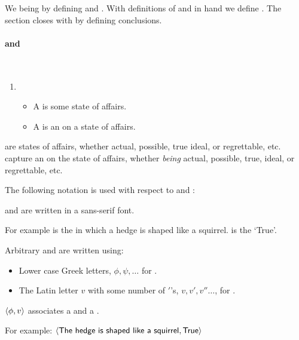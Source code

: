 \begin{note}
  We being by defining  and .
  With definitions of  and  in hand we define .
  The section closes with by defining conclusions.
\end{note}

\paragraph*{ and }

\begin{note}
  \begin{definition}
    \label{def:prop-val}
    \mbox{ }%
    \vspace{-\baselineskip}
    \begin{enumerate}[noitemsep, label=]
    \item
      \begin{itemize}
      \item
        A \emph{} is some state of affairs.
      \item
        A \emph{} is an \agpe{} on a state of affairs.
      \end{itemize}
    \end{enumerate}
    \vspace{-\baselineskip}
  \end{definition}

  \noindent%
   are states of affairs, whether actual, possible, true ideal, or regrettable, etc.
   capture an \agpe{} on the state of affairs, whether \emph{being} actual, possible, true, ideal, or regrettable, etc.
  
  The following notation is used with respect to  and :
  \begin{notationList}
  \item
     and  are written in a \textsf{sans-serif} font.
    
    For example  is the  in which a hedge is shaped like a squirrel.
     is the  `True'.
  \item
    Arbitrary  and  are written using:
    \begin{itemize}[noitemsep]
    \item
      Lower case Greek letters, \(\phi, \psi, \dots\) for .
    \item
      The Latin letter \(v\) with some number of \('\)'s, \(v, v', v'' \dots\), for .
    \end{itemize}
  \item
    \(\langle \phi, v \rangle\) associates a  and a .

    For example:
    \(\pv{\propI{The hedge is shaped like a squirrel}}{\valI{True}}\)
  \end{notationList}
\end{note}

